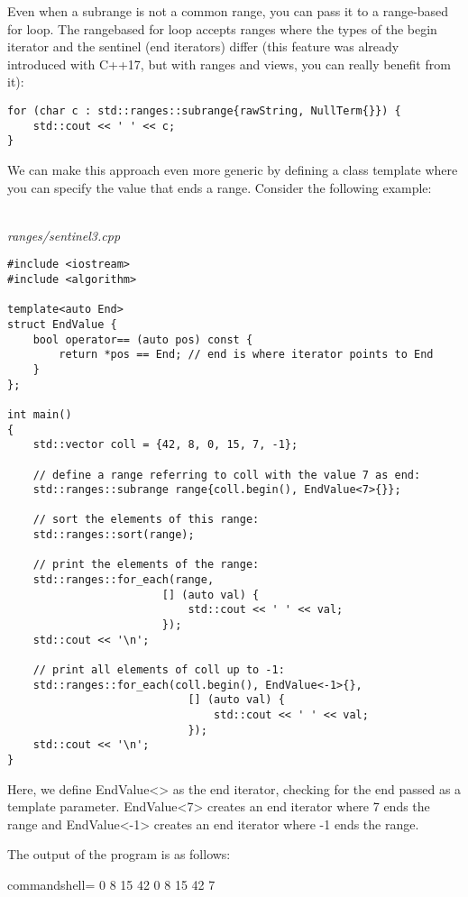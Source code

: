 Even when a subrange is not a common range, you can pass it to a range-based for loop. The rangebased for loop accepts ranges where the types of the begin iterator and the sentinel (end iterators) differ (this feature was already introduced with C++17, but with ranges and views, you can really benefit from it):

\begin{lstlisting}[style=styleCXX]
for (char c : std::ranges::subrange{rawString, NullTerm{}}) {
	std::cout << ' ' << c;
}
\end{lstlisting}

We can make this approach even more generic by defining a class template where you can specify the value that ends a range. Consider the following example:

\noindent
\hspace*{\fill} \\ %
\textit{ranges/sentinel3.cpp}

\begin{lstlisting}[style=styleCXX]
#include <iostream>
#include <algorithm>

template<auto End>
struct EndValue {
	bool operator== (auto pos) const {
		return *pos == End; // end is where iterator points to End
	}
};

int main()
{
	std::vector coll = {42, 8, 0, 15, 7, -1};
	
	// define a range referring to coll with the value 7 as end:
	std::ranges::subrange range{coll.begin(), EndValue<7>{}};
	
	// sort the elements of this range:
	std::ranges::sort(range);
	
	// print the elements of the range:
	std::ranges::for_each(range,
						[] (auto val) {
							std::cout << ' ' << val;
						});
	std::cout << '\n';
	
	// print all elements of coll up to -1:
	std::ranges::for_each(coll.begin(), EndValue<-1>{},
							[] (auto val) {
								std::cout << ' ' << val;
							});
	std::cout << '\n';
}
\end{lstlisting}

Here, we define EndValue<> as the end iterator, checking for the end passed as a template parameter. EndValue<7>{} creates an end iterator where 7 ends the range and EndValue<-1>{} creates an end iterator where -1 ends the range.

The output of the program is as follows:

\begin{tcblisting}{commandshell={}}
0 8 15 42
0 8 15 42 7
\end{tcblisting}

